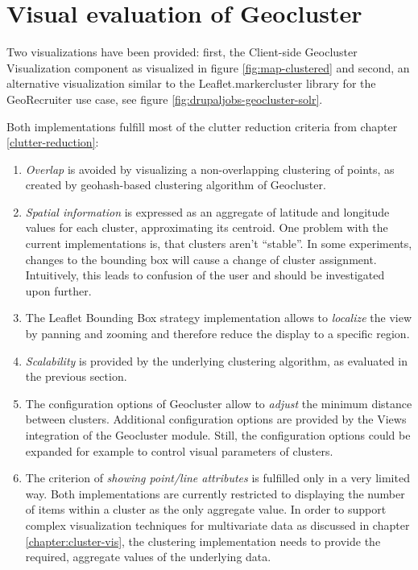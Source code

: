 \section{Visual evaluation of Geocluster}

Two visualizations have been provided: first, the Client-side Geocluster Visualization component as visualized in figure \ref{fig:map-clustered} and second, an alternative visualization similar to the Leaflet.markercluster library for the GeoRecruiter use case, see figure \ref{fig:drupaljobs-geocluster-solr}.

Both implementations fulfill most of the clutter reduction criteria from chapter \ref{clutter-reduction}:

\begin{enumerate}

\item \textit{Overlap} is avoided by visualizing a non-overlapping clustering of points, as created by geohash-based clustering algorithm of Geocluster.

\item \textit{Spatial information} is expressed as an aggregate of latitude and longitude values for each cluster, approximating its centroid. One problem with the current implementations is, that clusters aren't ``stable''. In some experiments, changes to the bounding box will cause a change of cluster assignment. Intuitively, this leads to confusion of the user and should be investigated upon further. 

\item The Leaflet Bounding Box strategy implementation allows to \textit{localize} the view by panning and zooming and therefore reduce the display to a specific region.

\item \textit{Scalability} is provided by the underlying clustering algorithm, as evaluated in the previous section.

\item The configuration options of Geocluster allow to \textit{adjust} the minimum distance between clusters. Additional configuration options are provided by the Views integration of the Geocluster module. Still, the configuration options could be expanded for example to control visual parameters of clusters. 

\item The criterion of \textit{showing point/line attributes} is fulfilled only in a very limited way. Both implementations are currently restricted to displaying the number of items within a cluster as the only aggregate value. In order to support complex visualization techniques for multivariate data as discussed in chapter \ref{chapter:cluster-vis}, the clustering implementation needs to provide the required, aggregate values of the underlying data.


\end{enumerate}

